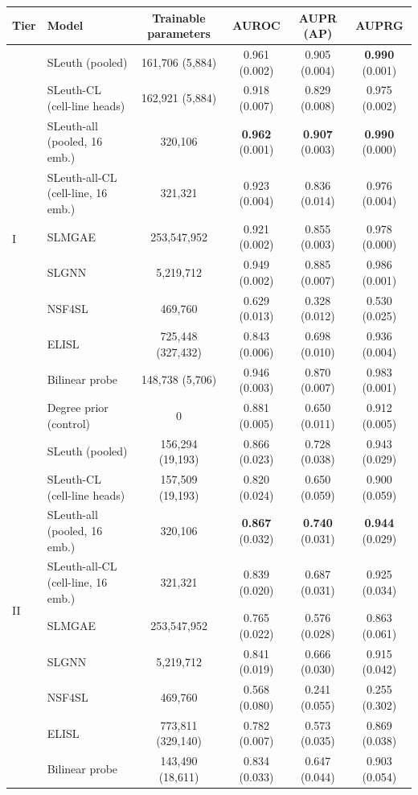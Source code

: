 \begin{tabular}{ll|cccc}
\hline
Tier & Model & Trainable parameters & AUROC & AUPR (AP) & AUPRG \\
\hline
\multirow{10}{*}{I} & SLeuth (pooled) & 161{,}706 (5{,}884) & 0.961 (0.002) & 0.905 (0.004) & \textbf{0.990} (0.001) \\
 & SLeuth-CL (cell-line heads) & 162{,}921 (5{,}884) & 0.918 (0.007) & 0.829 (0.008) & 0.975 (0.002) \\
 & SLeuth-all (pooled, 16 emb.) & 320{,}106 & \textbf{0.962} (0.001) & \textbf{0.907} (0.003) & \textbf{0.990} (0.000) \\
 & SLeuth-all-CL (cell-line, 16 emb.) & 321{,}321 & 0.923 (0.004) & 0.836 (0.014) & 0.976 (0.004) \\
 & SLMGAE & 253{,}547{,}952 & 0.921 (0.002) & 0.855 (0.003) & 0.978 (0.000) \\
 & SLGNN & 5{,}219{,}712 & 0.949 (0.002) & 0.885 (0.007) & 0.986 (0.001) \\
 & NSF4SL & 469{,}760 & 0.629 (0.013) & 0.328 (0.012) & 0.530 (0.025) \\
 & ELISL & 725{,}448 (327{,}432) & 0.843 (0.006) & 0.698 (0.010) & 0.936 (0.004) \\
 & Bilinear probe & 148{,}738 (5{,}706) & 0.946 (0.003) & 0.870 (0.007) & 0.983 (0.001) \\
 & Degree prior (control) & 0 & 0.881 (0.005) & 0.650 (0.011) & 0.912 (0.005) \\
\hline
\multirow{10}{*}{II} & SLeuth (pooled) & 156{,}294 (19{,}193) & 0.866 (0.023) & 0.728 (0.038) & 0.943 (0.029) \\
 & SLeuth-CL (cell-line heads) & 157{,}509 (19{,}193) & 0.820 (0.024) & 0.650 (0.059) & 0.900 (0.059) \\
 & SLeuth-all (pooled, 16 emb.) & 320{,}106 & \textbf{0.867} (0.032) & \textbf{0.740} (0.031) & \textbf{0.944} (0.029) \\
 & SLeuth-all-CL (cell-line, 16 emb.) & 321{,}321 & 0.839 (0.020) & 0.687 (0.031) & 0.925 (0.034) \\
 & SLMGAE & 253{,}547{,}952 & 0.765 (0.022) & 0.576 (0.028) & 0.863 (0.061) \\
 & SLGNN & 5{,}219{,}712 & 0.841 (0.019) & 0.666 (0.030) & 0.915 (0.042) \\
 & NSF4SL & 469{,}760 & 0.568 (0.080) & 0.241 (0.055) & 0.255 (0.302) \\
 & ELISL & 773{,}811 (329{,}140) & 0.782 (0.007) & 0.573 (0.035) & 0.869 (0.038) \\
 & Bilinear probe & 143{,}490 (18{,}611) & 0.834 (0.033) & 0.647 (0.044) & 0.903 (0.054) \\

\end{tabular}
